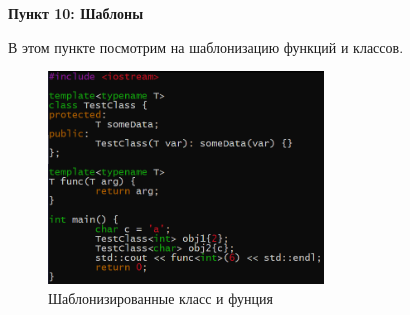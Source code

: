 \documentclass[a4paper,12pt]{article}
\begin{document}
\textbf{Пункт 10: Шаблоны}

В этом пункте посмотрим на шаблонизацию функций и классов.
\begin{figure}[H]\label{fig: Шаблоны код}
    \centering
    \includegraphics[width = 0.65\textwidth]{Шаблоны код.png}
    \caption{Шаблонизированные класс и фунция}
\end{figure}
\end{document}
